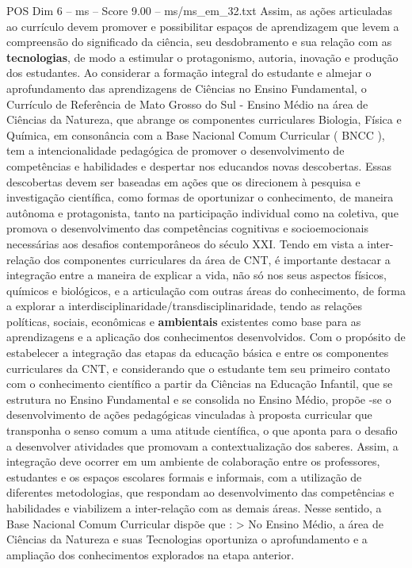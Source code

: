 \begin{textsample}{POS Dim 6 – ms – Score 9.00 – ms/ms\_em\_32.txt}
Assim, as ações articuladas ao currículo devem promover e possibilitar espaços de aprendizagem que levem a compreensão do significado da ciência, seu desdobramento e sua relação com as \textbf{tecnologias}, de modo a estimular o protagonismo, autoria, inovação e produção dos estudantes.
Ao considerar a formação integral do estudante e almejar o aprofundamento das aprendizagens de Ciências no Ensino Fundamental, o Currículo de Referência de Mato Grosso do Sul - Ensino Médio na área de Ciências da Natureza, que abrange os componentes curriculares Biologia, Física e Química, em consonância com a Base Nacional Comum Curricular ( BNCC ), tem a intencionalidade pedagógica de promover o desenvolvimento de competências e habilidades e despertar nos educandos novas descobertas.
Essas descobertas devem ser baseadas em ações que os direcionem à pesquisa e investigação científica, como formas de oportunizar o conhecimento, de maneira autônoma e protagonista, tanto na participação individual como na coletiva, que promova o desenvolvimento das competências cognitivas e socioemocionais necessárias aos desafios contemporâneos do século XXI.
Tendo em vista a inter-relação dos componentes curriculares da área de CNT, é importante destacar a integração entre a maneira de explicar a vida, não só nos seus aspectos físicos, químicos e biológicos, e a articulação com outras áreas do conhecimento, de forma a explorar a interdisciplinaridade/transdisciplinaridade, tendo as relações políticas, sociais, econômicas e \textbf{ambientais} existentes como base para as aprendizagens e a aplicação dos conhecimentos desenvolvidos.
Com o propósito de estabelecer a integração das etapas da educação básica e entre os componentes curriculares da CNT, e considerando que o estudante tem seu primeiro contato com o conhecimento científico a partir da Ciências na Educação Infantil, que se estrutura no Ensino Fundamental e se consolida no Ensino Médio, propõe -se o desenvolvimento de ações pedagógicas vinculadas à proposta curricular que transponha o senso comum a uma atitude científica, o que aponta para o desafio a desenvolver atividades que promovam a contextualização dos saberes.
Assim, a integração deve ocorrer em um ambiente de colaboração entre os professores, estudantes e os espaços escolares formais e informais, com a utilização de diferentes metodologias, que respondam ao desenvolvimento das competências e habilidades e viabilizem a inter-relação com as demais áreas.
Nesse sentido, a Base Nacional Comum Curricular dispõe que : > No Ensino Médio, a área de Ciências da Natureza e suas Tecnologias oportuniza o aprofundamento e a ampliação dos conhecimentos explorados na etapa anterior.

\end{textsample}
